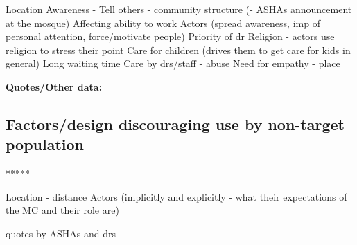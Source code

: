 Location
Awareness - Tell others - community structure (- ASHAs announcement at the mosque)
Affecting ability to work
Actors (spread awareness, imp of personal attention, force/motivate people)
Priority of dr
Religion - actors use religion to stress their point
Care for children (drives them to get care for kids in general)
Long waiting time
Care by drs/staff - abuse 
Need for empathy - place

\textbf{Quotes/Other data:}





\subsection{Factors/design discouraging use by non-target population}

*****

Location - distance
Actors (implicitly and explicitly - what their expectations of the MC and their role are)

quotes by ASHAs and drs